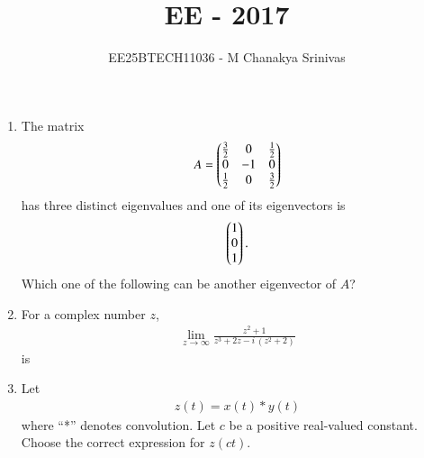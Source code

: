 \documentclass[journal,12pt,onecolumn]{IEEEtran}
\title{\LARGE \textbf{EE - 2017}}
\author{\Large EE25BTECH11036 - M Chanakya Srinivas}
\date{}
\theoremstyle{remark}
\begin{document}
\maketitle


\begin{enumerate}

\item The matrix 
\[
A = \begin{pmatrix}
\frac{3}{2} & 0 & \frac{1}{2} \\
0 & -1 & 0 \\
\frac{1}{2} & 0 & \frac{3}{2}
\end{pmatrix}
\]
has three distinct eigenvalues and one of its eigenvectors is 
\[
\begin{pmatrix} 1 \\ 0 \\ 1 \end{pmatrix}.
\]
Which one of the following can be another eigenvector of $A$?

\begin{enumerate}
\end{enumerate}

\item For a complex number $z$, 
\begin{align*}
    \lim_{z \to \infty} \frac{z^2 + 1}{z^3 + 2z - i\,(z^2+2)}
\end{align*}
is

\begin{enumerate}
\end{enumerate}

\item Let 
\begin{align*}
    z(t) = x(t) * y(t)
\end{align*}
 where ``*'' denotes convolution. Let $c$ be a positive real-valued constant.  
Choose the correct expression for $z(ct)$.


\end{enumerate}
\end{document}
